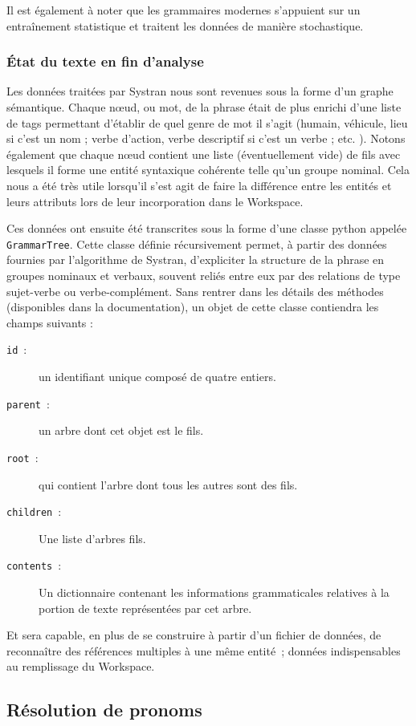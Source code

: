 \documentclass[a4paper, 12pt]{article}
\newcommand{\pyt}[1]{\texttt{#1}}%
\begin{document}
Il est également à noter que les grammaires modernes s'appuient sur un entraînement statistique et traitent les données de manière stochastique.

\subsubsection{\'Etat du texte en fin d'analyse}
Les données traitées par Systran nous sont revenues sous la forme d'un graphe sémantique. Chaque nœud, ou mot, de la phrase était de plus enrichi d'une liste de tags permettant d'établir de quel genre de mot il s'agit (humain, véhicule, lieu si c'est un nom ; verbe d'action, verbe descriptif si c'est un verbe ; etc. ). Notons également que chaque nœud contient une liste (éventuellement vide) de fils avec lesquels il forme une entité syntaxique cohérente telle qu'un groupe nominal. Cela nous a été très utile lorsqu'il s'est agit de faire la différence entre les entités et leurs attributs lors de leur incorporation dans le Workspace.

Ces données ont ensuite été transcrites sous la forme d'une classe python appelée \pyt{GrammarTree}. Cette classe définie récursivement permet, à partir des données fournies par l'algorithme de Systran, d'expliciter la structure de la phrase en groupes nominaux et verbaux, souvent reliés entre eux par des relations de type sujet-verbe ou verbe-complément. Sans rentrer dans les détails des méthodes (disponibles dans la documentation), un objet de cette classe contiendra les champs suivants :
\begin{description}
    \item[\pyt{id}~:] un identifiant unique composé de quatre entiers.
    \item[\pyt{parent}~:] un arbre dont cet objet est le fils.
    \item[\pyt{root}~:] qui contient l'arbre dont tous les autres sont des fils.
    \item[\pyt{children}~:] Une liste d'arbres fils.
    \item[\pyt{contents}~:] Un dictionnaire contenant les informations grammaticales relatives à la portion de texte représentées par cet arbre.
\end{description}

Et sera capable, en plus de se construire à partir d'un fichier de données, de reconnaître des références multiples à une même entité~; données indispensables au remplissage du Workspace.

\subsection{Résolution de pronoms}
\end{document}
